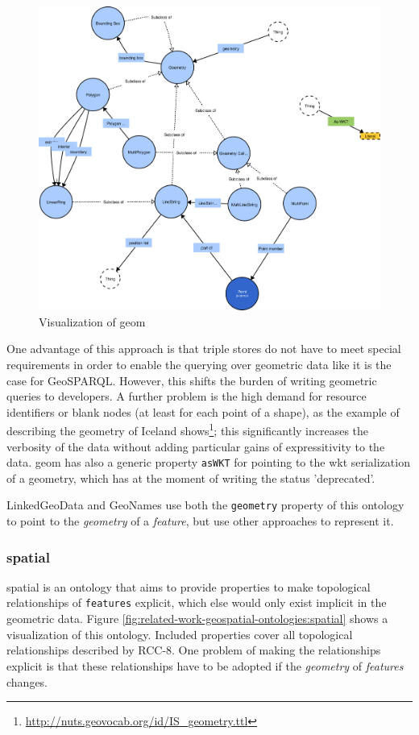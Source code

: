 \documentclass[draft,final]{vutinfth} %
\begin{document}
\begin{figure}[h]
    \centering
    \includegraphics[width=1.0\textwidth]{graphics/vocabularies/geom.png}
    \caption{Visualization of \gls{geom}}
    \label{fig:related-work-geospatial-ontologies:geom}
\end{figure}

One advantage of this approach is that triple stores do not have to meet special requirements in order to enable the querying over geometric data like it is the case for GeoSPARQL. However, this shifts the burden of writing geometric queries to developers. A further problem is the high demand for resource identifiers or blank nodes (at least for each point of a shape), as the example of describing the geometry of Iceland shows\footnote{\url{http://nuts.geovocab.org/id/IS_geometry.ttl}}; this significantly increases the verbosity of the data without adding particular gains of expressitivity to the data\cite{battle_geosparql:_2011}. \gls{geom} has also a generic property \texttt{asWKT} for pointing to the \gls{wkt} serialization of a geometry, which has at the moment of writing the status 'deprecated'.

LinkedGeoData and GeoNames use both the \texttt{geometry} property of this ontology to point to the \textit{geometry} of a \textit{feature}, but use other approaches to represent it.

\subsubsection{\gls{spatial}}
\gls{spatial} is an ontology that aims to provide properties to make topological relationships of \texttt{features} explicit, which else would only exist implicit in the geometric data. Figure \ref{fig:related-work-geospatial-ontologies:spatial} shows a visualization of this ontology. Included properties cover all topological relationships described by RCC-8. One problem of making the relationships explicit is that these relationships have to be adopted if the \textit{geometry} of \textit{features} changes.
\end{document}
